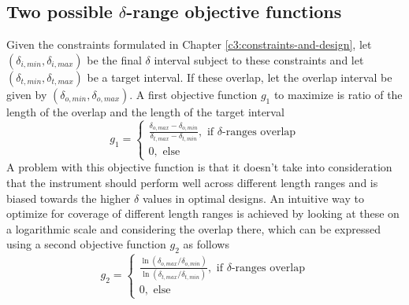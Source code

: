 \documentclass{article}
\begin{document}
\subsection{Two possible $\delta$-range objective functions}
Given the constraints formulated in Chapter \ref{c3:constraints-and-design}, let $(\delta_{i, min},\delta_{i, max})$ be the final $\delta$ interval subject to these constraints and let $(\delta_{t, min},\delta_{t, max})$ be a target interval. If these overlap, let the overlap interval be given by $(\delta_{o, min},\delta_{o, max})$. A first objective function $g_1$ to maximize is ratio of the length of the overlap and the length of the target interval
$$g_1 = \begin{cases}
	\frac{\delta_{o, max}-\delta_{o, min}}{\delta_{t, max} - \delta_{t, min}},\text{ if $\delta$-ranges overlap}\\
	0,\text{ else}
\end{cases}$$
A problem with this objective function is that it doesn't take into consideration that the instrument should perform well across different length ranges and is biased towards the higher $\delta$ values in optimal designs. An intuitive way to optimize for coverage of different length ranges is achieved by looking at these on a logarithmic scale and considering the overlap there, which can be expressed using a second objective function $g_2$ as follows 
$$g_2 = \begin{cases}
	\frac{\ln(\delta_{o, max}/\delta_{o, min})}{\ln(\delta_{t, max}/\delta_{t, min})},\text{ if $\delta$-ranges overlap}\\
	0,\text{ else}
\end{cases}$$







\printbibliography
\end{document}
